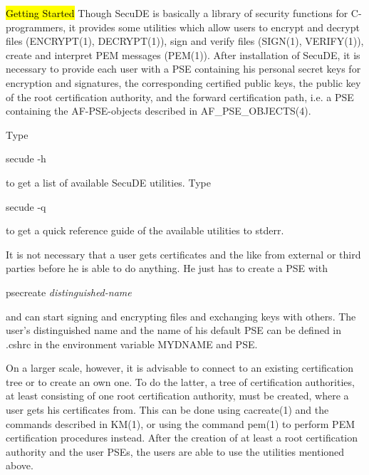 \hl{Getting Started}
Though SecuDE is basically a library of security functions for C-programmers, it
provides some utilities which allow users to encrypt and decrypt files (ENCRYPT(1), DECRYPT(1)),
sign and verify files (SIGN(1), VERIFY(1)), create and interpret PEM messages (PEM(1)).
After installation of SecuDE, it is necessary to provide each user with a PSE containing 
his personal secret keys for encryption and signatures, the corresponding certified public keys,
the public key of the root certification authority, and the forward certification path, i.e.
a PSE containing the AF-PSE-objects described in AF\_PSE\_OBJECTS(4).

Type

\begin{center}
secude -h
\end{center}
 
to get a list of available SecuDE utilities. Type

\begin{center}
secude -q
\end{center}

to get a quick reference guide of the available utilities to stderr. 

It is not necessary that a user gets certificates and the like from external or
third parties before he is able to do anything. He just has to create a PSE
with
\begin{center}
psecreate {\em distinguished-name}
\end{center} 
and can start signing and encrypting files and exchanging keys with others. The user's
distinguished name and the name of his default PSE can be defined in .cshrc
in the environment variable MYDNAME and PSE.

On a larger scale, however, it is advisable to connect to an existing certification
tree or to create an own one. To do the latter, a tree of certification authorities, at least consisting of one root 
certification authority, must be created, where a user gets his certificates from. 
This can be done using cacreate(1) and the commands described in KM(1), or using
the command pem(1) to perform PEM certification procedures instead.
After the creation of at least
a root certification authority and the user PSEs, the users are able to
use the utilities mentioned above.
 
